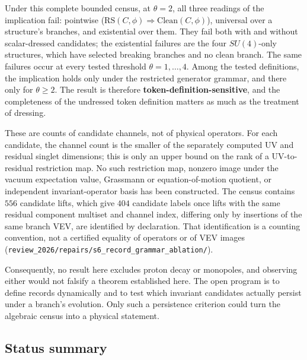 \documentclass[11pt]{article}
\theoremstyle{definition}
\begin{document}
Under this complete bounded census, at \(\theta=2\), all three readings of the implication fail: pointwise
(\(\mathrm{RS}(C,\phi)\Rightarrow\mathrm{Clean}(C,\phi)\)), universal over a structure's branches, and existential over
them. They fail both with and without scalar-dressed candidates; the existential failures are the four
\(SU(4)\)-only structures, which have selected breaking branches and no clean branch. The same failures occur at
every tested threshold \(\theta=1,\dots,4\). Among the tested definitions, the implication holds only under the
restricted generator grammar, and there only for \(\theta\ge2\). The result is therefore \textbf{token-definition-sensitive}, and the completeness of
the undressed token definition matters as much as the treatment of dressing.

These are counts of candidate channels, not of physical operators. For each candidate, the channel count is the
smaller of the separately computed UV and residual singlet dimensions; this is only an upper bound on the rank of a
UV-to-residual restriction map. No such restriction map, nonzero image under the vacuum expectation value,
Grassmann or equation-of-motion quotient, or independent invariant-operator basis has been constructed. The census
contains \(556\) candidate lifts, which give \(404\) candidate labels once lifts with the same residual component
multiset and channel index, differing only by insertions of the same branch VEV, are identified by declaration. That
identification is a counting convention, not a certified equality of operators or of VEV images
(\nolinkurl{review_2026/repairs/s6_record_grammar_ablation/}).

Consequently, no result here excludes proton decay or monopoles, and observing either would not falsify a theorem
established here. The open program is to define records dynamically and to test which invariant candidates actually
persist under a branch's evolution. Only such a persistence criterion could turn the algebraic census into a physical
statement.

\subsection{Status summary}\label{prediction-status-summary}
\end{document}
